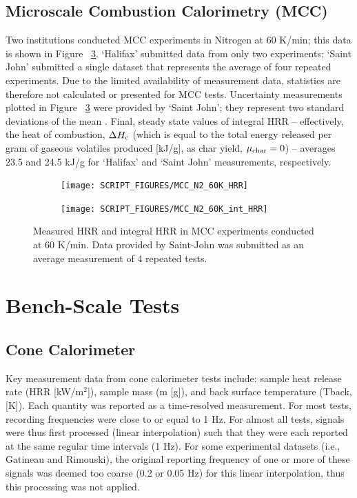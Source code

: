 \documentclass{book}
\begin{document}
\subsection{Microscale Combustion Calorimetry (MCC)}

Two institutions conducted MCC experiments in Nitrogen at 60 K/min; this data is shown in Figure ~\ref{Fig:MCC_N2_60K}. ‘Halifax’ submitted data from only two experiments; ‘Saint John’ submitted a single dataset that represents the average of four repeated experiments.  Due to the limited availability of measurement data, statistics are therefore not calculated or presented for MCC tests. Uncertainty measurements plotted in Figure ~\ref{Fig:MCC_N2_60K} were provided by ‘Saint John’; they represent two standard deviations of the mean \cite{fiola2020comparison}. Final, steady state values of integral HRR – effectively, the heat of combustion, $\Delta H_{\rm c}$ (which is equal to the total energy released per gram of gaseous volatiles produced [kJ/g], as char yield, $\mu_{\rm char}=0$) – averages 23.5 and 24.5 kJ/g for ‘Halifax’ and ‘Saint John’ measurements, respectively.

\begin{figure}
\centering
\begin{subfigure}[b]{0.85\textwidth}
   \texttt{[image: SCRIPT\_FIGURES/MCC\_N2\_60K\_HRR]}
   \caption{}
   \label{Fig:MCC_N2_60K_HRR}
\end{subfigure}

\begin{subfigure}[b]{0.85\textwidth}
   \texttt{[image: SCRIPT\_FIGURES/MCC\_N2\_60K\_int\_HRR]}
   \caption{}
   \label{Fig:MCC_N2_60K_int_HRR}
\end{subfigure}

  \caption{Measured HRR and integral HRR in MCC experiments conducted at 60 K/min. Data provided by Saint-John was submitted as an average measurement of 4 repeated tests.}
  \label{Fig:MCC_N2_60K}
\end{figure}


\section{Bench-Scale Tests}

\subsection{Cone Calorimeter}

Key measurement data from cone calorimeter tests include: sample heat release rate (HRR [kW/m$^2$]), sample mass (m [g]), and back surface temperature (Tback, [K]). Each quantity was reported as a time-resolved measurement. For most tests, recording frequencies were close to or equal to 1 Hz. For almost all tests, signals were thus first processed (linear interpolation) such that they were each reported at the same regular time intervals (1 Hz). For some experimental datasets (i.e., Gatineau and Rimouski), the original reporting frequency of one or more of these signals was deemed too coarse (0.2 or 0.05 Hz) for this linear interpolation, thus this processing was not applied.
\end{document}
